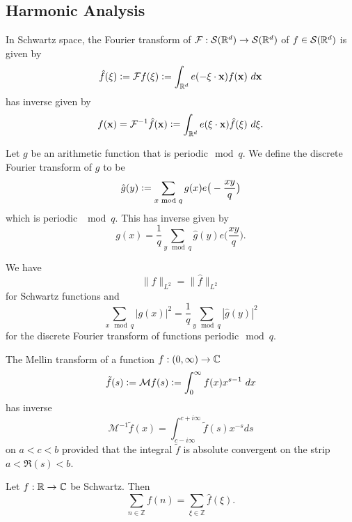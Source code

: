 \subsection*{Harmonic Analysis}
\begin{theorem}
	In Schwartz space, the Fourier transform of $\mathcal{F}:\mathcal{S}(\mathbb{R}^d)\to\mathcal{S}(\mathbb{R}^d)$ of $f\in\mathcal{S}(\mathbb{R}^d)$ is given by
    \[
        \hat{f}(\mathbf{\xi})\defeq\mathcal{F}f(\mathbf{\xi})\defeq \int_{\reals^d} e(- \mathbf{\xi}\cdot \mathbf{x}) f(\mathbf{x}) \ d\mathbf{x}
    \]
    has inverse given by 
    \[
       f(\mathbf{x})= \mathcal{F}^{-1}\hat{f}(\mathbf{x})\defeq \int_{\reals^d} e(\mathbf{\xi}\cdot \mathbf{x}) \hat{f}(\mathbf{\xi}) \ d\mathbf{\xi}.
    \]
\end{theorem}
\begin{theorem}
	Let $g$ be an arithmetic function that is periodic$\mod q$. We define the discrete Fourier transform of $g$ to be \[
		\hat{g}(y) \mathrel{\mathop:}= \sum_{x \textrm{ mod } q}g(x)e\big(-\frac{xy}{q}\big)
	\]
	which is periodic $\mod q$.
	This has inverse given by \[
		g(x) = \frac{1}{q}\sum_{y\mod q} \hat{g}(y)e\big(\frac{xy}{q}\big).
	\]
\end{theorem}
\begin{theorem}
We have \[
\|f\|_{L^2}=\|\hat{f}\|_{L^2}
\]
for Schwartz functions and \[
\sum_{x\mod q}|g(x)|^2 = \frac{1}{q}\sum_{y\mod q}|\hat{g}(y)|^2
\]
for the discrete Fourier transform of functions periodic$\mod q$.

\end{theorem}
\begin{theorem}
	The Mellin transform of a function $f:(0,\infty)\to\mathbb{C}$
	\[
	\tilde{f}(s) \mathrel{\mathop:}= \mathcal{M}f(s) \mathrel{\mathop:}= \int_{0}^{\infty}f(x) x^{s-1} \ dx
	\]
	has inverse \[
	\mathcal{M}^{-1} \tilde{f} (x) = \int_{c-i\infty}^{c+i\infty} \tilde{f}(s) x^{-s}ds
	\]
	on $a<c<b$ provided that the integral $\tilde{f}$ is absolute convergent on the strip $a<\Re(s)<b$.
\end{theorem}
\begin{theorem}
	Let $f:\mathbb{R}\to\mathbb{C}$ be Schwartz. Then \[
	\sum_{n\in \mathbb{Z}} f(n) = \sum_{\xi\in\mathbb{Z}} \hat{f}(\xi).
	\]
\end{theorem}